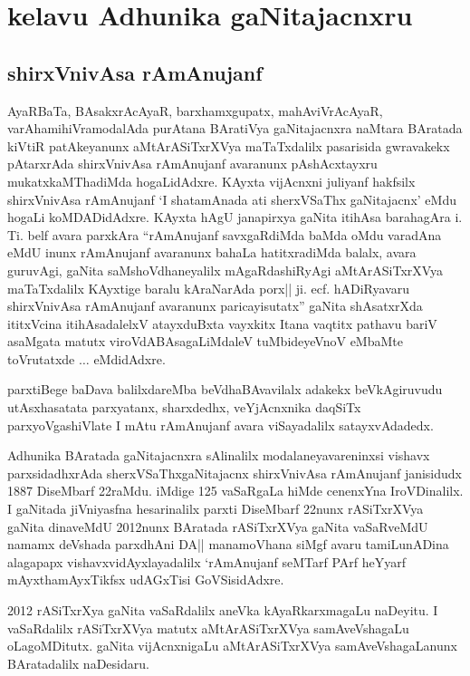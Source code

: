 \chapter{kelavu Adhunika gaNitajacnxru}

\section{{\protect\bf shirxVnivAsa rAmAnujanf}}


AyaRBaTa, BAsakxrAcAyaR, barxhamxgupatx, mahAviVrAcAyaR, varAha\-mihiVra\break modalAda purAtana BAratiVya gaNitajacnxra naMtara BAratada kiVtiR patAkeyanunx aMtA\-rASiTxrXVya maTaTxdalilx pasarisida gwravakekx pAtarxrAda shirxVnivAsa rAmAnujanf avaranunx pAshAcxtayxru mukatxkaMThadiMda hogaLidAdxre. KAyxta vijAcnxni juliyanf hakfsilx shirxVnivAsa rAmAnujanf `I shatamAnada ati sherxVSaThx gaNitajacnx' eMdu hogaLi koMDADidAdxre. KAyxta hAgU janapirxya gaNita itihAsa barahagAra i. Ti. belf avara parxkAra ``rAmAnu\-janf savxgaRdiMda baMda oMdu varadAna eMdU inunx rAmAnujanf avaranunx bahaLa hatitxradiMda balalx, avara guruvAgi, gaNita saMshoVdhaneyalilx mAgaRdashiRyAgi aMtArASiTxrXVya maTaTxdalilx KAyxtige baralu kAraNarAda porx|| ji. ecf. hADiRyavaru shirxVnivAsa rAmAnujanf avaranunx paricayisutatx'' gaNita shAsatxrXda ititxVcina itihAsadalelxV atayxduBxta vayxkitx Itana vaqtitx pathavu bariV asaMgata matutx viroVdA\-BAsagaLiMdaleV tuMbideyeVnoV eMbaMte toVrutatxde $\ldots$ eMdidAdxre.

parxtiBege baDava balilxdareMba beVdhaBAvavilalx adakekx beVkAgiruvudu utAsxha\break satata parxyatanx, sharxdedhx, veYjAcnxnika daqSiTx parxyoVgashiVlate I mAtu rAmAnujanf avara viSayadalilx satayxvAdadedx.

Adhunika BAratada gaNitajacnxra sAlinalilx modalaneyavareninxsi vishavx parxsidadhxrAda sherxVSaThxgaNitajacnx shirxVnivAsa rAmAnujanf janisidudx {\rm 1887} DiseMbarf {\rm 22}raMdu. iMdige {\rm 125} vaSaRgaLa hiMde cenenxYna IroVDinalilx. I gaNitada jiVniyasfna hesarinalilx parxti DiseM\-barf {\rm 22}nunx rASiTxrXVya gaNita dinaveMdU {\rm 2012}nunx BAratada rASiTxrXVya gaNita vaSaR\-veMdU namamx deVshada parxdhAni DA|| manamoVhana siMgf avaru tamiLunADina alagapapx vishavxvidAyxlayadalilx `rAmAnujanf seMTarf PArf heYyarf mAyxthamAyxTikfsx udAGxTisi GoVSisidAdxre.

{\rm 2012} rASiTxrXya gaNita vaSaRdalilx aneVka kAyaRkarxmagaLu naDeyitu. I vaSaRdalilx rASiTxrXVya matutx aMtArASiTxrXVya samAveVshagaLu oLagoMDitutx. gaNita vijAcnxnigaLu aMtArASiTxrXVya samAveVshagaLanunx BAratadalilx naDesidaru.

